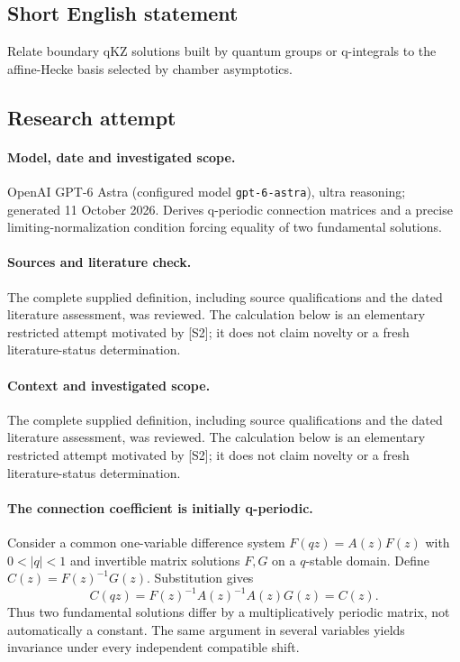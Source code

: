 \documentclass[11pt]{article}
\begin{document}
\subsection{Short English statement}
Relate boundary qKZ solutions built by quantum groups or q-integrals to the affine-Hecke basis selected by chamber asymptotics.
\subsection{Research attempt}
\paragraph{Model, date and investigated scope.}
OpenAI GPT-6 Astra (configured model \texttt{gpt-6-astra}), ultra reasoning; generated 11 October 2026. Derives q-periodic connection matrices and a precise limiting-normalization condition forcing equality of two fundamental solutions.

\paragraph{Sources and literature check.}
The complete supplied definition, including source qualifications and the dated literature assessment, was reviewed. The calculation below is an elementary restricted attempt motivated by [S2]; it does not claim novelty or a fresh literature-status determination.

\paragraph{Context and investigated scope.} The complete supplied definition, including source qualifications and the dated literature assessment, was reviewed. The calculation below is an elementary restricted attempt motivated by [S2]; it does not claim novelty or a fresh literature-status determination.

\paragraph{The connection coefficient is initially q-periodic.} Consider a common one-variable difference system $F(qz)=A(z)F(z)$ with $0<|q|<1$ and invertible matrix solutions $F,G$ on a $q$-stable domain. Define $C(z)=F(z)^{-1}G(z)$. Substitution gives
\[
 C(qz)=F(z)^{-1}A(z)^{-1}A(z)G(z)=C(z).
\]
Thus two fundamental solutions differ by a multiplicatively periodic matrix, not automatically a constant. The same argument in several variables yields invariance under every independent compatible shift.
\end{document}
